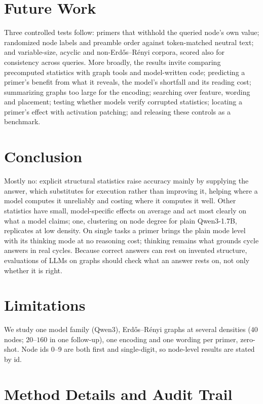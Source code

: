 \documentclass[11pt]{article}
\begin{document}
\section{Future Work}
\label{sec:future}
Three controlled tests follow: primers that withhold the queried node's own value; randomized node labels and preamble order against token-matched neutral text; and variable-size, acyclic and non-Erd\H{o}s--R\'enyi corpora, scored also for consistency across queries. More broadly, the results invite comparing precomputed statistics with graph tools and model-written code; predicting a primer's benefit from what it reveals, the model's shortfall and its reading cost; summarizing graphs too large for the encoding; searching over feature, wording and placement; testing whether models verify corrupted statistics; locating a primer's effect with activation patching; and releasing these controls as a benchmark.

\section{Conclusion}
\label{sec:conclusion}
Mostly no: explicit structural statistics raise accuracy mainly by supplying the answer, which substitutes for execution rather than improving it, helping where a model computes it unreliably and costing where it computes it well. Other statistics have small, model-specific effects on average and act most clearly on what a model claims; one, clustering on node degree for plain Qwen3-1.7B, replicates at low density. On single tasks a primer brings the plain mode level with its thinking mode at no reasoning cost; thinking remains what grounds cycle answers in real cycles. Because correct answers can rest on invented structure, evaluations of LLMs on graphs should check what an answer rests on, not only whether it is right.

\section*{Limitations}
We study one model family (Qwen3), Erd\H{o}s--R\'enyi graphs at several densities ($40$ nodes; $20$--$160$ in one follow-up), one encoding and one wording per primer, zero-shot. Node ids 0--9 are both first and single-digit, so node-level results are stated by id.

\clearpage


\clearpage
\appendix
\makeatletter
\setlength{\@fptop}{0pt}
\setlength{\@dblfptop}{0pt}
\makeatother
\section{Method Details and Audit Trail}
\label{app:audit}
\end{document}
